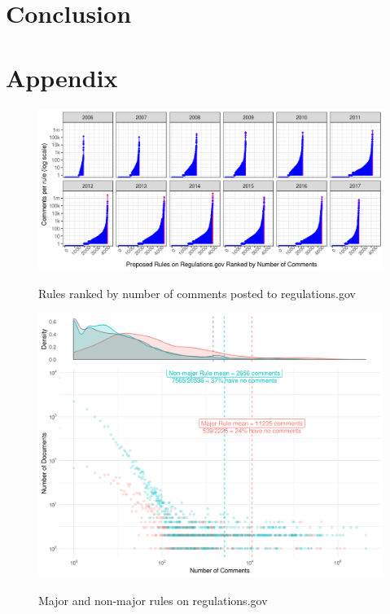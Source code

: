 \documentclass{article}
\begin{document}
\section{Conclusion}


\newpage
\section{Appendix}



\begin{figure}[h!]
    \centering
        \caption{Rules ranked by number of comments posted to regulations.gov}
    \includegraphics[width = 6.5in]{Figs/rules-ranked-comments-per-year-1.png}
    \label{fig:rules-ranked}
\end{figure}

\begin{figure}[p!]
    \centering
        \caption{Major and non-major rules on regulations.gov}
    \includegraphics[width = 7in]{Figs/major-comments-density-1.png}
    \label{fig:rules-major}
\end{figure}
\end{document}
